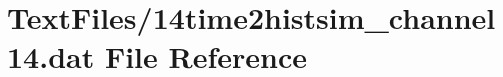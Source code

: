 \hypertarget{14time2histsim__channel14_8dat}{}\section{Text\+Files/14time2histsim\+\_\+channel14.dat File Reference}
\label{14time2histsim__channel14_8dat}
